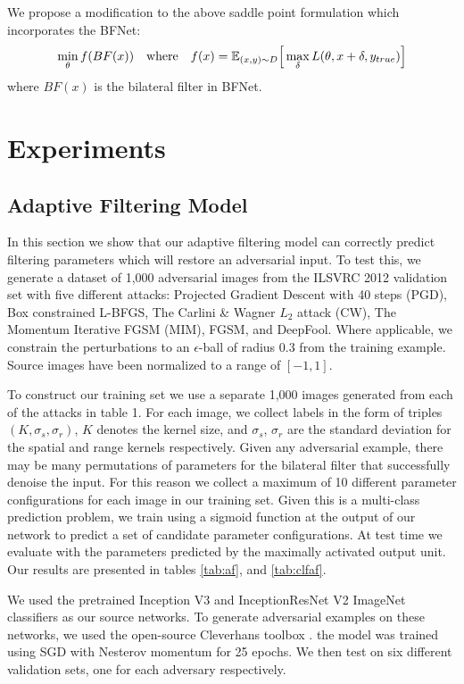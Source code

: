 \documentclass{article} %
\begin{document}
We propose a modification to the above saddle point formulation which incorporates the BFNet:
\[
\min_{\theta} f(BF(x)) \quad \textnormal{where} \quad f(x) = \mathbb{E}_{(x, y)\sim D} \Big[ \max_{\delta} L(\theta, x + \delta, y_{true})\Big]
\]
where $BF(x)$ is the bilateral filter in BFNet.



\section{Experiments}

\subsection{Adaptive Filtering Model}
In this section we show that our adaptive filtering model can correctly predict filtering parameters which will restore an adversarial input. To test this, we generate a dataset of 1,000 adversarial images from the ILSVRC 2012 validation set with five different attacks: Projected Gradient Descent with 40 steps (PGD), Box constrained L-BFGS, The Carlini \& Wagner $L_2$ attack (CW), The Momentum Iterative FGSM (MIM), FGSM, and DeepFool.
Where applicable, we constrain the perturbations to an $\epsilon$-ball of radius $0.3$ from the training example. Source images have been normalized to a range of $[-1, 1]$.

To construct our training set we use a separate 1,000 images generated from each of the attacks in table 1. For each image, we collect labels in the form of triples $(K, \sigma_s, \sigma_r)$, $K$ denotes the kernel size, and $\sigma_s$, $\sigma_r$ are the standard deviation for the spatial and range kernels respectively. Given any adversarial example, there may be many permutations of parameters for the bilateral filter that successfully denoise the input. For this reason we collect a maximum of 10 different parameter configurations for each image in our training set. Given this is a multi-class prediction problem, we train using a sigmoid function at the output of our network to predict a set of candidate parameter configurations. At test time we evaluate with the parameters predicted by the maximally activated output unit. Our results are presented in tables \ref{tab:af}, and \ref{tab:clfaf}. 

We used the pretrained Inception V3 \citep{szegedy2016rethinking} and InceptionResNet V2 \citep{szegedy2017inception} ImageNet classifiers as our source networks. To generate adversarial examples on these networks, we used the open-source Cleverhans toolbox \citep{papernot2016cleverhans}.
the model was trained using SGD with Nesterov momentum for 25 epochs. We then test on six different validation sets, one for each adversary respectively. 
\end{document}
